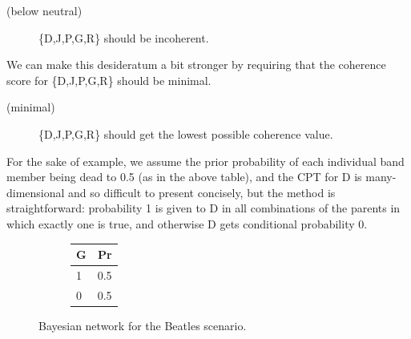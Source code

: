 \documentclass[
  10pt,
]{scrartcl}
\newcommand{\s}[1]{\textsf{#1}}
\begin{document}
\begin{description}
    \item[(below neutral)] \{\s{D,J,P,G,R}\} should be incoherent.
\end{description}\vspace{2mm}

We can make this desideratum a bit stronger by requiring that the coherence score for \{\s{D,J,P,G,R}\} should be minimal.
\vspace{2mm}

\begin{description}
    \item[(minimal)] \{\s{D,J,P,G,R}\} should get the lowest possible coherence value.
\end{description}\vspace{2mm}

For the sake of example, we assume the prior probability of each individual band member being dead to 0.5 (as in the above table), and the CPT for \textsf{D} is many-dimensional and so difficult to present concisely, but the method is straightforward: probability 1 is given to \textsf{D} in all combinations of the parents in which exactly one is true, and otherwise \textsf{D} gets conditional probability 0.

\begin{figure}[H]
 \hfill
\begin{subfigure}[!ht]{0.2\textwidth}

\begin{tabular}{lr}
\toprule
G & Pr\\
\midrule
1 & 0.5\\
0 & 0.5\\
\bottomrule
\end{tabular}
\end{subfigure}
\caption{Bayesian network for the \textsf{Beatles} scenario.}
\end{figure}
\end{document}
